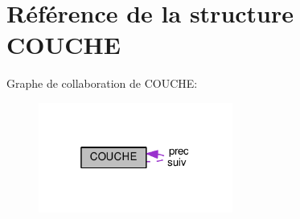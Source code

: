 \hypertarget{structCOUCHE}{}\section{Référence de la structure C\+O\+U\+C\+HE}
\label{structCOUCHE}


Graphe de collaboration de C\+O\+U\+C\+HE\+:
\nopagebreak
\begin{figure}[H]
\begin{center}
\leavevmode
\includegraphics[width=181pt]{structCOUCHE__coll__graph}
\end{center}
\end{figure}
